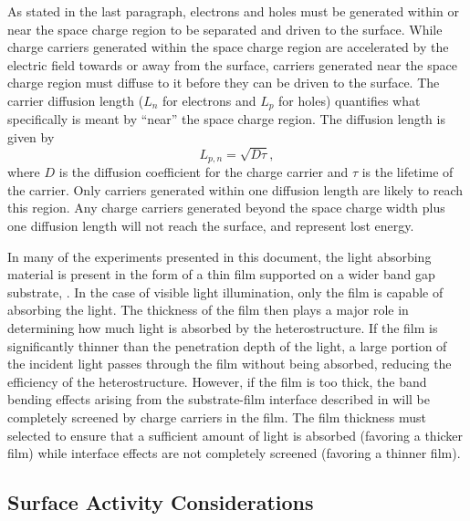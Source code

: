 As stated in the last paragraph, electrons and holes must be generated 
within or near the space charge region to be separated and driven to the 
surface. While charge carriers generated within the space charge region are 
accelerated by the electric field towards or away from the surface, 
carriers generated near the space charge region must diffuse to it before 
they can be driven to the surface.  The carrier diffusion length ($L_{n}$ 
for electrons and $L_{p}$ for holes) quantifies what specifically is meant 
by ``near'' the space charge region. The diffusion length is given by
\begin{equation}
	\label{fig:diffusionlength}
	L_{p,n}=\sqrt{D\tau},
\end{equation}
where $D$ is the diffusion coefficient for the charge carrier and $\tau$ is 
the lifetime of the carrier. Only carriers generated within one diffusion 
length are likely to reach this region. Any charge carriers generated 
beyond the space charge width plus one diffusion length will not reach the 
surface, and represent lost energy.

In many of the experiments presented in this document, the light absorbing 
 material is present in the form of a thin film supported on a 
wider band gap substrate, . In the case of visible light 
illumination, only the film is capable of absorbing the light. The 
thickness of the film then plays a major role in determining how much light 
is absorbed by the heterostructure. If the film is significantly thinner 
than the penetration depth of the light, a large portion of the incident 
light passes through the film without being absorbed, reducing the 
efficiency of the heterostructure. However, if the film is too thick, the 
band bending effects arising from the substrate-film interface described in 
 will be completely screened by charge 
carriers in the film. The film thickness must selected to ensure that a 
sufficient amount of light is absorbed (favoring a thicker film) while 
interface effects are not completely screened (favoring a thinner film).


\subsection{Surface Activity Considerations}
\label{subsec:background.surfaceactivity}


